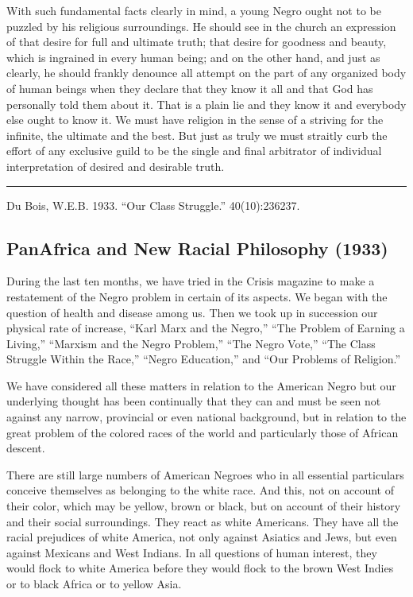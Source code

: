 \documentclass[letterpaper,10pt,english]{jupyterBook}
\begin{document}
\sphinxAtStartPar
With such fundamental facts clearly in mind, a young Negro ought not to be puzzled by his religious surroundings. He should see in the church an expression of that desire for full and ultimate truth; that desire for goodness and beauty, which is ingrained in every human being; and on the other hand, and just as clearly, he should frankly denounce all attempt on the part of any organized body of human beings when they declare that they know it all and that God has personally told them about it. That is a plain lie and they know it and everybody else ought to know it. We must have religion in the sense of a striving for the infinite, the ultimate and the best. But just as truly we must straitly curb the effort of any exclusive guild to be the single and final arbitrator of individual interpretation of desired and desirable truth.


\bigskip\hrule\bigskip


\sphinxAtStartPar
{} Du Bois, W.E.B. 1933. “Our Class Struggle.”  40(10):236\sphinxhyphen{}237.


\subsection{Pan\sphinxhyphen{}Africa and New Racial Philosophy (1933)}
\label{\detokenize{Volumes/40/11/panafrica_and_new_racial_philosophy:pan-africa-and-new-racial-philosophy-1933}}\label{\detokenize{Volumes/40/11/panafrica_and_new_racial_philosophy::doc}}
\sphinxAtStartPar
During the last ten months, we have tried in the Crisis magazine to make a re\sphinxhyphen{}statement of the Negro problem in certain of its aspects. We began with the question of health and disease among us. Then we took up in succession our physical rate of increase, “Karl Marx and the Negro,” “The Problem of Earning a Living,” “Marxism and the Negro Problem,” “The Negro Vote,” “The Class Struggle Within the Race,” “Negro Education,” and “Our Problems of Religion.”

\sphinxAtStartPar
We have considered all these matters in relation to the American Negro but our underlying thought has been continually that they can and must be seen not against any narrow, provincial or even national background, but in relation to the great problem of the colored races of the world and particularly those of African descent.

\sphinxAtStartPar
There are still large numbers of American Negroes who in all essential particulars conceive themselves as belonging to the white race. And this, not on account of their color, which may be yellow, brown or black, but on account of their history and their social surroundings. They react as white Americans. They have all the racial prejudices of white America, not only against Asiatics and Jews, but even against Mexicans and West Indians. In all questions of human interest, they would flock to white America before they would flock to the brown West Indies or to black Africa or to yellow Asia.
\end{document}
